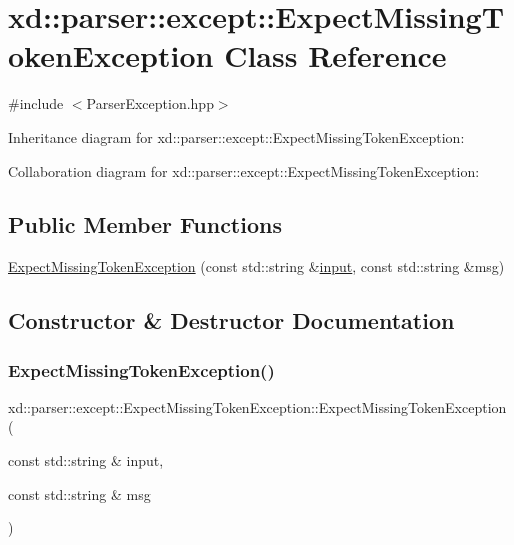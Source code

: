 \hypertarget{classxd_1_1parser_1_1except_1_1_expect_missing_token_exception}{}\section{xd\+:\+:parser\+:\+:except\+:\+:Expect\+Missing\+Token\+Exception Class Reference}
\label{classxd_1_1parser_1_1except_1_1_expect_missing_token_exception}


{\ttfamily \#include $<$Parser\+Exception.\+hpp$>$}



Inheritance diagram for xd\+:\+:parser\+:\+:except\+:\+:Expect\+Missing\+Token\+Exception\+:


Collaboration diagram for xd\+:\+:parser\+:\+:except\+:\+:Expect\+Missing\+Token\+Exception\+:
\subsection*{Public Member Functions}
\begin{DoxyCompactItemize}
\item 
\mbox{\hyperlink{classxd_1_1parser_1_1except_1_1_expect_missing_token_exception_a2e4923ae6be77505c4a904b111657722}{Expect\+Missing\+Token\+Exception}} (const std\+::string \&\mbox{\hyperlink{classxd_1_1parser_1_1except_1_1_parser_exception_a6fde0ecef06df6bc2bcaef504269acea}{input}}, const std\+::string \&msg)
\end{DoxyCompactItemize}


\subsection{Constructor \& Destructor Documentation}
\mbox{\label{classxd_1_1parser_1_1except_1_1_expect_missing_token_exception_a2e4923ae6be77505c4a904b111657722}} 
\subsubsection{\texorpdfstring{Expect\+Missing\+Token\+Exception()}{ExpectMissingTokenException()}}
{\footnotesize\ttfamily xd\+::parser\+::except\+::\+Expect\+Missing\+Token\+Exception\+::\+Expect\+Missing\+Token\+Exception (\begin{DoxyParamCaption}\item[{const std\+::string \&}]{input,  }\item[{const std\+::string \&}]{msg }\end{DoxyParamCaption})\hspace{0.3cm}{\ttfamily [inline]}}



